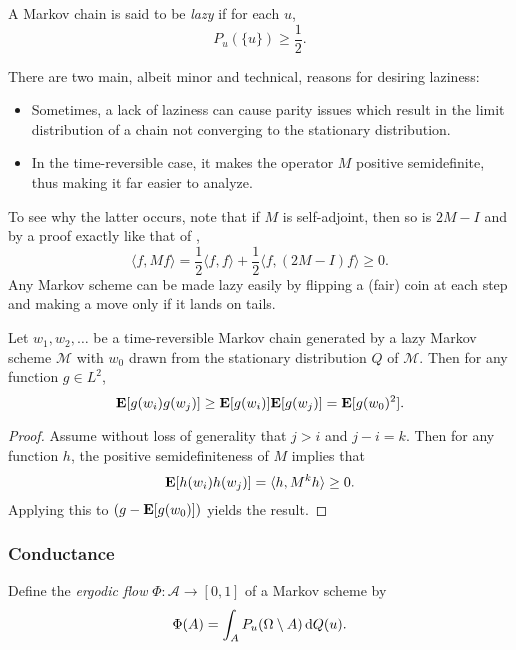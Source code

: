 \begin{definition}[Laziness]
A Markov chain is said to be \textit{lazy} if for each $u$,
\[ P_u(\{u\})\geq\frac{1}{2}. \]
\end{definition}

There are two main, albeit minor and technical, reasons for desiring laziness:
\begin{itemize}
    \item Sometimes, a lack of laziness can cause parity issues which result in the limit distribution of a chain not converging to the stationary distribution.
    \item In the time-reversible case, it makes the operator $M$ positive semidefinite, thus making it far easier to analyze.
\end{itemize}
To see why the latter occurs, note that if $M$ is self-adjoint, then so is $2M-I$ and by a proof exactly like that of ,
\[ \langle f,M f\rangle = \frac{1}{2}\langle f,f\rangle + \frac{1}{2}\langle f,(2M-I)f\rangle \geq 0. \]
Any Markov scheme can be made lazy easily by flipping a (fair) coin at each step and making a move only if it lands on tails.

\begin{lemma}
Let $w_1,w_2,\ldots$ be a time-reversible Markov chain generated by a lazy Markov scheme $\mathcal{M}$ with $w_0$ drawn from the stationary distribution $Q$ of $\mathcal{M}$. Then for any function $g\in L^2$,
\[ \textbf{E}[g(w_i)g(w_j)] \geq \textbf{E}[g(w_i)]\textbf{E}[g(w_j)] = \textbf{E}[g(w_0)^2]. \]
\end{lemma}
\begin{proof}
Assume without loss of generality that $j>i$ and $j-i=k$. Then for any function $h$, the positive semidefiniteness of $M$ implies that
\[ \textbf{E}[h(w_i)h(w_j)] = \langle h, M^k h\rangle \geq 0. \]
Applying this to $(g - \textbf{E}[g(w_0)])$ yields the result.
\end{proof}

\subsubsection{Conductance}

\begin{definition}
Define the \textit{ergodic flow} $\Phi:\mathcal{A}\to[0,1]$ of a Markov scheme by
\[ \Phi(A) = \int_A P_u(\Omega \setminus A) \operatorname{d}\!{Q}(u). \]

\end{definition}

